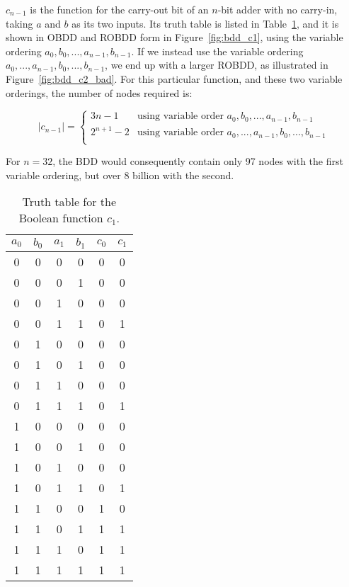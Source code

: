 \documentclass[a4paper,11pt]{kth-mag}
\begin{document}
$c_{n-1}$ is the function for the carry-out bit of an $n$-bit adder with no carry-in, taking $a$ and $b$ as its two inputs.
Its truth table is listed in Table~\ref{tab:tt_c1}, and it is shown in OBDD and ROBDD form in Figure~\ref{fig:bdd_c1}, using the variable ordering $a_0,b_0,...,a_{n-1},b_{n-1}$.
If we instead use the variable ordering $a_0,...,a_{n-1},b_0,...,b_{n-1}$, we end up with a larger ROBDD, as illustrated in Figure~\ref{fig:bdd_c2_bad}.
For this particular function, and these two variable orderings, the number of nodes required is:

$$
  |c_{n-1}| = \left\{
  \begin{array}{ll}
    3n-1      & \textrm{using variable order $a_0,b_0,...,a_{n-1},b_{n-1}$} \\
    2^{n+1}-2 & \textrm{using variable order $a_0,...,a_{n-1},b_0,...,b_{n-1}$} \\
  \end{array}\right.
$$

For $n = 32$, the BDD would consequently contain only 97 nodes with the first variable ordering, but over 8 billion with the second.

\begin{table}
\centering
\begin{tabular}{cccc|cc}
$a_0$ & $b_0$ & $a_1$ & $b_1$ & $c_0$ & $c_1$ \\
\hline
0     & 0     & 0     & 0     & 0     & 0 \\
0     & 0     & 0     & 1     & 0     & 0 \\
0     & 0     & 1     & 0     & 0     & 0 \\
0     & 0     & 1     & 1     & 0     & 1 \\
0     & 1     & 0     & 0     & 0     & 0 \\
0     & 1     & 0     & 1     & 0     & 0 \\
0     & 1     & 1     & 0     & 0     & 0 \\
0     & 1     & 1     & 1     & 0     & 1 \\
1     & 0     & 0     & 0     & 0     & 0 \\
1     & 0     & 0     & 1     & 0     & 0 \\
1     & 0     & 1     & 0     & 0     & 0 \\
1     & 0     & 1     & 1     & 0     & 1 \\
1     & 1     & 0     & 0     & 1     & 0 \\
1     & 1     & 0     & 1     & 1     & 1 \\
1     & 1     & 1     & 0     & 1     & 1 \\
1     & 1     & 1     & 1     & 1     & 1 \\
\end{tabular}
\caption{Truth table for the Boolean function $c_1$.}
\label{tab:tt_c1}
\end{table}
\end{document}
